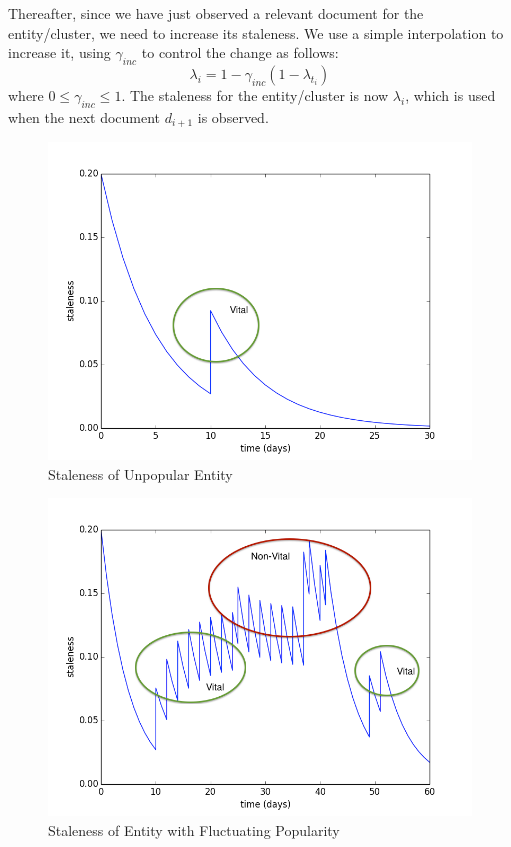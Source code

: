 \documentclass{article}
\begin{document}
Thereafter, since we have just observed a relevant document for the entity/cluster, we need to increase its staleness. 
We use a simple interpolation to increase it, using $\gamma_{inc}$ to control the change as follows:
\begin{equation}
\lambda_i = 1 - \gamma_{inc}(1 - \lambda_{t_i})
\end{equation}
where $0 \leq \gamma_{inc} \leq 1$.
The staleness for the entity/cluster is now $\lambda_i$, which is used when the next document $d_{i+1}$ is observed.

\begin{figure}[tb]
\centering
\includegraphics[width=0.7\columnwidth]{fig/staleness1.png}
\caption{Staleness of Unpopular Entity}
\label{stalenesslow}
\end{figure}

\begin{figure}[tb]
\centering
\includegraphics[width=0.7\columnwidth]{fig/staleness2.png}
\caption{Staleness of Entity with Fluctuating Popularity}
\label{stalenessmedium}
\end{figure}
\end{document}
